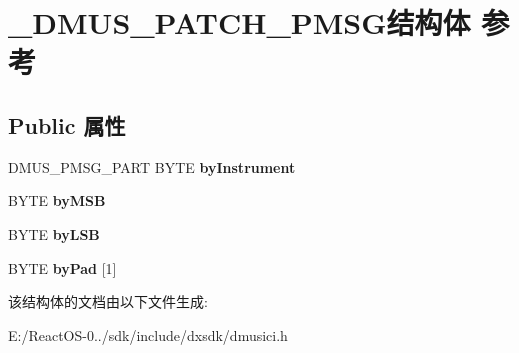 \hypertarget{struct___d_m_u_s___p_a_t_c_h___p_m_s_g}{}\section{\+\_\+\+D\+M\+U\+S\+\_\+\+P\+A\+T\+C\+H\+\_\+\+P\+M\+S\+G结构体 参考}
\label{struct___d_m_u_s___p_a_t_c_h___p_m_s_g}
\subsection*{Public 属性}
\begin{DoxyCompactItemize}
\item 
\mbox{\label{struct___d_m_u_s___p_a_t_c_h___p_m_s_g_a4bec69525d14c4a98b9cc31c6da05757}} 
D\+M\+U\+S\+\_\+\+P\+M\+S\+G\+\_\+\+P\+A\+RT B\+Y\+TE {\bfseries by\+Instrument}
\item 
\mbox{\label{struct___d_m_u_s___p_a_t_c_h___p_m_s_g_ac1d98d01f569e9426a6d073c1e34eecd}} 
B\+Y\+TE {\bfseries by\+M\+SB}
\item 
\mbox{\label{struct___d_m_u_s___p_a_t_c_h___p_m_s_g_acdad328655764cf9f4a2cfe18c93d6cc}} 
B\+Y\+TE {\bfseries by\+L\+SB}
\item 
\mbox{\label{struct___d_m_u_s___p_a_t_c_h___p_m_s_g_a5e5415f93d3553b4a65f3d9b2f614f35}} 
B\+Y\+TE {\bfseries by\+Pad} \mbox{[}1\mbox{]}
\end{DoxyCompactItemize}


该结构体的文档由以下文件生成\+:\begin{DoxyCompactItemize}
\item 
E\+:/\+React\+O\+S-\/0../sdk/include/dxsdk/dmusici.\+h\end{DoxyCompactItemize}
